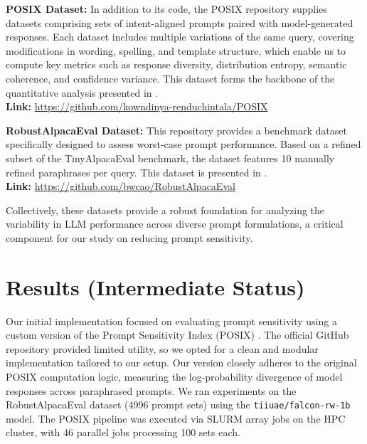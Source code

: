 \documentclass[fleqn,moreauthors,10pt]{ds_report}
\begin{document}
\vspace{1em}
\textbf{POSIX Dataset:} In addition to its code, the POSIX repository supplies datasets comprising sets of intent-aligned prompts paired with model-generated responses. Each dataset includes multiple variations of the same query, covering modifications in wording, spelling, and template structure, which enable us to compute key metrics such as response diversity, distribution entropy, semantic coherence, and confidence variance. This dataset forms the backbone of the quantitative analysis presented in \cite{chatterjee-etal-2024-posix}.\\
\textbf{Link:} \url{https://github.com/kowndinya-renduchintala/POSIX}

\vspace{1em}
\textbf{RobustAlpacaEval Dataset:} This repository provides a benchmark dataset specifically designed to assess worst-case prompt performance. Based on a refined subset of the TinyAlpacaEval benchmark, the dataset features 10 manually refined paraphrases per query. This dataset is presented in \cite{cao2024worstpromptperformancelarge}.\\
\textbf{Link:} \url{https://github.com/bwcao/RobustAlpacaEval}

Collectively, these datasets provide a robust foundation for analyzing the variability in LLM performance across diverse prompt formulations, a critical component for our study on reducing prompt sensitivity.




\section*{Results (Intermediate Status)}

Our initial implementation focused on evaluating prompt sensitivity using a custom version of the Prompt Sensitivity Index (POSIX) \cite{chatterjee-etal-2024-posix}. The official GitHub repository provided limited utility, so we opted for a clean and modular implementation tailored to our setup. Our version closely adheres to the original POSIX computation logic, measuring the log-probability divergence of model responses across paraphrased prompts. We ran experiments on the RobustAlpacaEval dataset (4996 prompt sets) using the \texttt{tiiuae/falcon-rw-1b} model. The POSIX pipeline was executed via SLURM array jobs on the HPC cluster, with 46 parallel jobs processing 100 sets each.
\end{document}
